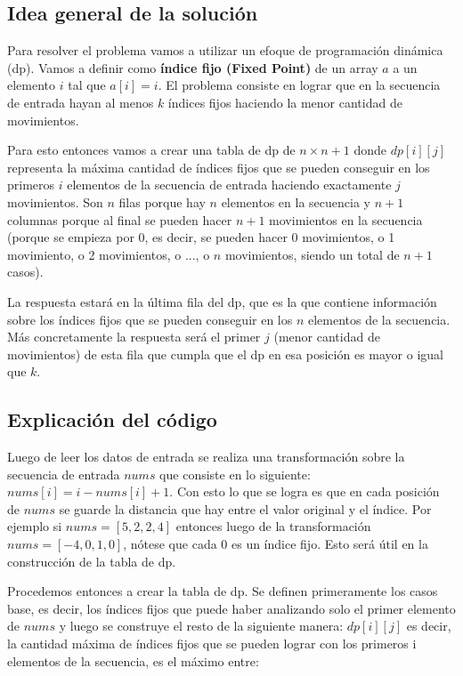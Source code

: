 \documentclass[11pt]{article}
\begin{document}
    \subsection{Idea general de la solución}
    Para resolver el problema vamos a utilizar un efoque de programación dinámica (dp). Vamos a definir como
    \textbf{índice fijo (Fixed Point)} de un array $a$ a un elemento $i$ tal que $a[i] = i$. El problema consiste
    en lograr que en la secuencia de entrada hayan al menos $k$ índices fijos haciendo la menor cantidad de movimientos.

    Para esto entonces vamos a crear una tabla de dp de $n \times n+1$ donde $dp[i][j]$ representa la máxima cantidad
    de índices fijos que se pueden conseguir en los primeros $i$ elementos de la secuencia de entrada haciendo
    exactamente $j$ movimientos. Son $n$ filas porque hay $n$ elementos en la secuencia y $n+1$ columnas porque al
    final se pueden hacer $n+1$ movimientos en la secuencia (porque se empieza por 0, es decir, se pueden hacer
    0 movimientos, o 1 movimiento, o 2 movimientos, o ..., o $n$ movimientos, siendo un total de $n+1$ casos).

    La respuesta estará en la última fila del dp, que es la que contiene información sobre los índices fijos que se
    pueden conseguir en los $n$ elementos de la secuencia. Más concretamente la respuesta será el primer $j$ (menor
    cantidad de movimientos) de esta fila que cumpla que el dp en esa posición es mayor o igual que $k$.

    \subsection{Explicación del código}
    Luego de leer los datos de entrada se realiza una transformación sobre la secuencia de entrada $nums$ que consiste
    en lo siguiente: $nums[i] = i - nums[i] + 1$. Con esto lo que se logra es que en cada posición de $nums$ se guarde
    la distancia que hay entre el valor original y el índice. Por ejemplo si $nums = [5,2,2,4]$ entonces luego de la
    transformación $nums = [-4, 0, 1, 0]$, nótese que cada 0 es un índice fijo. Esto será útil en la construcción de 
    la tabla de dp.

    Procedemos entonces a crear la tabla de dp. Se definen primeramente los casos base, es decir, los índices fijos
    que puede haber analizando solo el primer elemento de $nums$ y luego se construye el resto de la siguiente manera:
    $dp[i][j]$ es decir, la cantidad máxima de índices fijos que se pueden lograr con los primeros i elementos de la
    secuencia, es el máximo entre:
\end{document}
